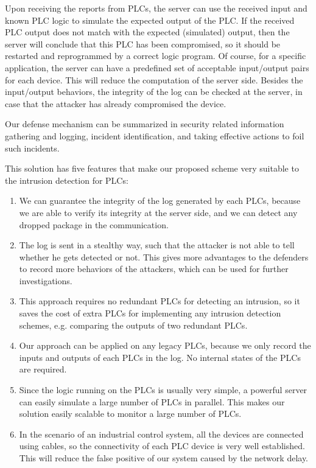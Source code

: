 Upon receiving the reports from PLCs, the server can use the received input and known PLC logic to simulate the expected output of the PLC. If the received PLC output does not match with the expected (simulated) output, then the server will conclude that this PLC has been compromised, so it should be restarted and reprogrammed by a correct logic program. Of course, for a specific application, the server can have a predefined set of acceptable input/output pairs for each device. This will reduce the computation of the server side. Besides the input/output behaviors, the integrity of the log can be checked at the server, in case that the attacker has already compromised the device.

Our defense mechanism can be summarized in security related information gathering and logging, incident identification, and taking effective actions to foil such incidents.

This solution has five features that make our proposed scheme very suitable to the intrusion detection for PLCs:

\begin{enumerate}
\item We can guarantee the integrity of the log generated by each PLCs, because we are able to verify its integrity at the server side, and we can detect any dropped package in the communication.  

\item The log is sent in a stealthy way, such that the attacker is not able to tell whether he gets detected or not. This gives more advantages to the defenders to record more behaviors of the attackers, which can be used for further investigations.  

\item This approach requires no redundant PLCs for detecting an intrusion, so it saves the cost of extra PLCs for implementing any intrusion detection schemes, e.g. comparing the outputs of two redundant PLCs. 

\item Our approach can be applied on any legacy PLCs, because we only record the inputs and outputs of each PLCs in the log. No internal states of the PLCs are required. 

\item Since the logic running on the PLCs is usually very simple, a powerful server can easily simulate a large number of PLCs in parallel. This makes our solution easily scalable to monitor a large number of PLCs.

\item In the scenario of an industrial control system, all the devices are connected using cables, so the connectivity of each PLC device is very well established. This will reduce the false positive of our system caused by the network delay. 

\end{enumerate} 


